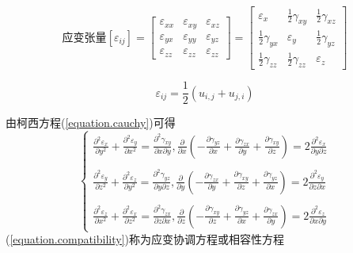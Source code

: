 \documentclass{book}
\begin{document}
\begin{equation}
\text{应变张量}
[\varepsilon_{ij}]=
\left[
  \begin{array}{ccc}
  \varepsilon_{xx} & \varepsilon_{xy} & \varepsilon_{xz} \\
  \varepsilon_{yx} & \varepsilon_{yy} & \varepsilon_{yz} \\
  \varepsilon_{zz} & \varepsilon_{zz} & \varepsilon_{zz}
  \end{array}
\right]
=
\left[
  \begin{array}{ccc}
  \varepsilon_{x} & \frac{1}{2}\gamma_{xy} & \frac{1}{2}\gamma_{xz} \\
  \frac{1}{2}\gamma_{yx} & \varepsilon_{y} & \frac{1}{2}\gamma_{yz} \\
  \frac{1}{2}\gamma_{zz} & \frac{1}{2}\gamma_{zz} & \varepsilon_{z}
  \end{array}
\right]
\end{equation}

\begin{equation}
 \varepsilon_{ij}=\frac{1}{2}(u_{i,j}+u_{j,i})
\end{equation}

由柯西方程(\ref{equation.cauchy})可得
\begin{equation}
  \left\{
	\begin{array}{ll}
	\frac{\partial^2 \varepsilon_x }{\partial y^2} + \frac{\partial^2 \varepsilon_y }{\partial x^2} = \frac{\partial^2 \gamma_{xy}}{\partial x\partial y} , \frac{\partial}{\partial x}(- \frac{\partial \gamma_{yz}}{\partial x} +\frac{\partial \gamma_{zx}}{\partial y} +\frac{\partial \gamma_{xy}}{\partial z} ) = 2 \frac{\partial^2 \varepsilon_x}{\partial y\partial z}
	\\\\
	\frac{\partial^2 \varepsilon_y }{\partial z^2} + \frac{\partial^2 \varepsilon_z }{\partial y^2} = \frac{\partial^2 \gamma_{yz}}{\partial y\partial z} , \frac{\partial}{\partial y}(- \frac{\partial \gamma_{zx}}{\partial y} +\frac{\partial \gamma_{xy}}{\partial z} +\frac{\partial \gamma_{yz}}{\partial x} ) = 2 \frac{\partial^2 \varepsilon_y}{\partial z\partial x}
\\\\
	\frac{\partial^2 \varepsilon_z }{\partial x^2} + \frac{\partial^2 \varepsilon_x }{\partial z^2} = \frac{\partial^2 \gamma_{zx}}{\partial z\partial x} , \frac{\partial}{\partial z}(- \frac{\partial \gamma_{xy}}{\partial z} +\frac{\partial \gamma_{yz}}{\partial x} +\frac{\partial \gamma_{zx}}{\partial y} ) = 2 \frac{\partial^2 \varepsilon_z}{\partial x\partial y}
	\end{array}
	\right.
\label{equation.compatibility}
\end{equation}
(\ref{equation.compatibility})称为应变协调方程或相容性方程\\
\end{document}
